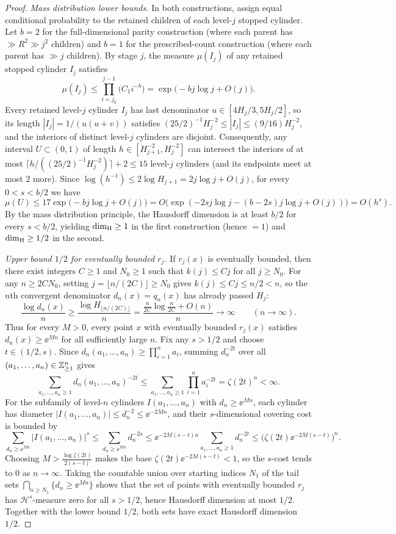 \begin{proof}
\emph{Mass distribution lower bounds.} In both constructions, assign equal
conditional probability to the retained children of each level-$j$ stopped
cylinder. Let $b=2$ for the full-dimensional parity construction (where each
parent has $\gg R^2\gg j^2$ children) and $b=1$ for the prescribed-count
construction (where each parent has $\gg j$ children). By stage $j$, the
measure $\mu(I_j)$ of any retained stopped cylinder $I_j$ satisfies
\[
\mu(I_j)\le\prod_{i=j_0}^{j-1}\bigl(C_1 i^{-b}\bigr)=\exp\bigl(-bj\log j+O(j)\bigr).
\]
Every retained level-$j$ cylinder $I_j$ has last denominator
$u\in[4H_j/3,5H_j/2]$, so its length $|I_j|=1/(u(u+v))$ satisfies
$(25/2)^{-1}H_j^{-2}\le|I_j|\le(9/16)H_j^{-2}$, and the interiors of distinct
level-$j$ cylinders are disjoint. Consequently, any interval $U\subset(0,1)$ of
length $h\in[H_{j+1}^{-2},H_j^{-2}]$ can intersect the interiors of at most
$\lceil h/((25/2)^{-1}H_j^{-2})\rceil+2\le 15$ level-$j$ cylinders (and its
endpoints meet at most $2$ more). Since
$\log(h^{-1})\le2\log H_{j+1}=2j\log j+O(j)$, for every $0<s<b/2$ we have
\[
\mu(U)\le 17\exp\bigl(-bj\log j+O(j)\bigr)
=O\bigl(\exp(-2s j\log j- (b-2s)j\log j+O(j))\bigr)=O(h^s).
\]
By the mass distribution principle, the Hausdorff dimension is at least $b/2$
 for every $s<b/2$, yielding $\dim_{\mathrm{H}}\ge1$ in the first construction (hence $=1$)
and $\dim_{\mathrm{H}}\ge1/2$ in the second.

\emph{Upper bound $1/2$ for eventually bounded $r_j$.} If $r_j(x)$ is
eventually bounded, then there exist integers $C\ge1$ and $N_0\ge1$ such that
$k(j)\le Cj$ for all $j\ge N_0$. For any $n\ge2CN_0$, setting
$j=\lfloor n/(2C)\rfloor\ge N_0$ gives $k(j)\le Cj\le n/2<n$, so the $n$th
convergent denominator $d_n(x)=q_n(x)$ has already passed $H_j$:
\[
\frac{\log d_n(x)}{n}\ge\frac{\log H_{\lfloor n/(2C)\rfloor}}{n}
=\frac{\frac{n}{2C}\log\frac{n}{2C}+O(n)}{n}\longrightarrow\infty
\qquad(n\to\infty).
\]
Thus for every $M>0$, every point $x$ with eventually bounded $r_j(x)$ satisfies
$d_n(x)\ge\ee^{Mn}$ for all sufficiently large $n$. Fix any $s>1/2$ and choose
$t\in(1/2,s)$. Since $d_n(a_1,\dots,a_n)\ge\prod_{i=1}^n a_i$, summing
$d_n^{-2t}$ over all $(a_1,\dots,a_n)\in\mathbb{Z}_{\ge1}^n$ gives
\[
\sum_{a_1,\dots,a_n\ge1} d_n(a_1,\dots,a_n)^{-2t}
\le\sum_{a_1,\dots,a_n\ge1}\prod_{i=1}^n a_i^{-2t}=\zeta(2t)^n<\infty.
\]
For the subfamily of level-$n$ cylinders $I(a_1,\dots,a_n)$ with
$d_n\ge\ee^{Mn}$, each cylinder has diameter
$|I(a_1,\dots,a_n)|\le d_n^{-2}\le\ee^{-2Mn}$, and their $s$-dimensional
covering cost is bounded by
\[
\sum_{d_n\ge\ee^{Mn}}\bigl|I(a_1,\dots,a_n)\bigr|^s
\le\sum_{d_n\ge\ee^{Mn}} d_n^{-2s}
\le\ee^{-2M(s-t)n}\sum_{a_1,\dots,a_n\ge1} d_n^{-2t}
\le\bigl(\zeta(2t)\ee^{-2M(s-t)}\bigr)^n.
\]
Choosing $M>\frac{\log\zeta(2t)}{2(s-t)}$ makes the base
$\zeta(2t)\ee^{-2M(s-t)}<1$, so the $s$-cost tends to $0$ as $n\to\infty$.
Taking the countable union over starting indices $N_1$ of the tail sets
$\bigcap_{n\ge N_1}\{d_n\ge\ee^{Mn}\}$ shows that the set of points with
eventually bounded $r_j$ has $\mathcal H^s$-measure zero for all $s>1/2$, hence
Hausdorff dimension at most $1/2$. Together with the lower bound $1/2$, both
sets have exact Hausdorff dimension $1/2$.
\end{proof}

